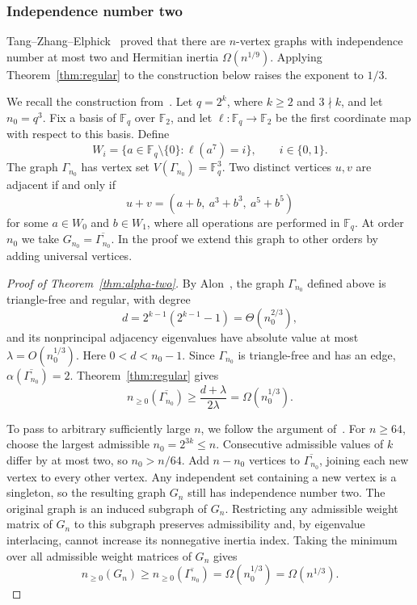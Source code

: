 \documentclass[11pt]{article}
\numberwithin{equation}{section}
\theoremstyle{definition}
\theoremstyle{remark}
\begin{document}
\subsubsection{Independence number two}

Tang--Zhang--Elphick~\cite[Theorem~1.2]{TZE} proved that
there are $n$-vertex graphs with independence number at most two
and Hermitian inertia $\Omega(n^{1/9})$. Applying Theorem~\ref{thm:regular} to the construction below raises
the exponent to $1/3$.

We recall the construction from~\cite[Section~2]{Alon1994}.
Let $q=2^k$, where $k\geq2$ and $3\nmid k$, and let $n_0=q^3$.
Fix a basis of $\mathbb F_q$ over $\mathbb F_2$, and let
$\ell:\mathbb F_q\to\mathbb F_2$ be the first coordinate map
with respect to this basis. Define
\[
 W_i=\{a\in\mathbb F_q\setminus\{0\}:\ell(a^7)=i\},
 \qquad i\in\{0,1\}.
\]
The graph $\Gamma_{n_0}$ has vertex set
$V(\Gamma_{n_0})=\mathbb F_q^3$.
Two distinct vertices $u,v$ are adjacent if and only if
\[
 u+v=(a+b,\ a^3+b^3,\ a^5+b^5)
\]
for some $a\in W_0$ and $b\in W_1$, where all operations are
performed in $\mathbb F_q$.
At order $n_0$ we take $G_{n_0}=\overline{\Gamma_{n_0}}$.
In the proof we extend this graph to other orders by adding
universal vertices.

\begin{proof}[Proof of Theorem~\ref{thm:alpha-two}]
By Alon~\cite[Theorem~2.1]{Alon1994}, the graph
$\Gamma_{n_0}$ defined above is triangle-free and regular, with degree
\begin{equation}\label{eq:Alon-degree}
 d=2^{k-1}(2^{k-1}-1)=\Theta(n_0^{2/3}),
\end{equation}
and its nonprincipal adjacency eigenvalues have absolute value at
most $\lambda=O(n_0^{1/3})$.
Here $0<d<n_0-1$.
Since $\Gamma_{n_0}$ is triangle-free and has an edge,
$\alpha(\overline{\Gamma_{n_0}})=2$.
Theorem~\ref{thm:regular} gives
\begin{equation}\label{eq:Alon-application}
 n_{\geq0}(\overline{\Gamma_{n_0}})
 \geq\frac{d+\lambda}{2\lambda}
 =\Omega(n_0^{1/3}).
\end{equation}

To pass to arbitrary sufficiently large $n$, we follow
the argument of~\cite[proof of Theorem~1.2]{TZE}.
For $n\geq64$, choose the largest admissible
$n_0=2^{3k}\leq n$.
Consecutive admissible values of $k$ differ by at most two,
so $n_0>n/64$.
Add $n-n_0$ vertices to $\overline{\Gamma_{n_0}}$, joining each
new vertex to every other vertex. Any independent set containing
a new vertex is a singleton, so the resulting graph $G_n$ still
has independence number two. The original graph is an induced
subgraph of $G_n$. Restricting any admissible weight matrix of $G_n$
to this subgraph preserves admissibility and, by eigenvalue
interlacing, cannot increase its nonnegative inertia index. Taking
the minimum over all admissible weight matrices of $G_n$ gives
\[
 n_{\geq0}(G_n)
 \geq n_{\geq0}(\overline{\Gamma_{n_0}})
 =\Omega(n_0^{1/3})
 =\Omega(n^{1/3}).
\]
\end{proof}
\end{document}
